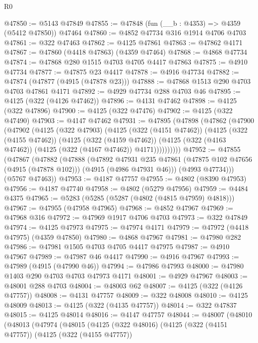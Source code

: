 \begin{lexlean}{R0}
\begin{coremodule}
@47850 := @5143 @47849
@47855 := @47848 (fun (__b : @4353) => @4359 (@5412 @47850)) @47464
@47860 := @4852 @47734 @316 @1914 @4706 @4703
@47861 := @322 @47463
@47862 := @4125 @47861
@47863 := @47862 @4171
@47867 := @47860 (@4418 @47863) (@4359 @47464)
@47868 := @4868 @47734
@47874 := @47868 @280 @1515 @4703 @4705 @4417 @47863
@47875 := @4910 @47734
@47877 := @47875 @23 @4417
@47878 := @4916 @47734
@47882 := @47874 (@47877 (@4915 (@47878 @23)))
@47888 := @47868 @1513 @290 @4703 @4703 @47861 @4171
@47892 := @4929 @47734 @288 @4703 @46
@47895 := @4125 (@322 (@4126 @47462))
@47896 := @4131 @47462
@47898 := @4125 (@322 @47896)
@47900 := @4125 (@322 @47476)
@47902 := @4125 (@322 @47490)
@47903 := @4147 @47462
@47931 := @47895
    (@47898
      (@47862
        (@47900
          (@47902
            (@4125
              (@322 @47903)
              (@4125
                (@322 (@4151 @47462))
                (@4125
                  (@322 (@4155 @47462))
                  (@4125
                    (@322 (@4159 @47462))
                    (@4125 (@322 (@4163 @47462)) (@4125 (@322 (@4167 @47462)) @4171))))))))))
@47952 := @47855
    (@47867
      (@47882
        (@47888
          (@47892
            @47931
            @235
            @47861
            (@47875 @102 @47656 (@4915 (@47878 @102)))
            (@4915 (@4986 @47931 @46)))
          (@4993 @47734)))
      (@5767 @47463))
@47953 := @4187 @47757
@47955 := @4802 (@8390 @47953)
@47956 := @4187 @47740
@47958 := @4802 (@5279 @47956)
@47959 := @4484 @4375
@47965 := @5283 (@5285 (@5287 (@4802 (@4815 @47959) @4818)))
@47967 := @47955 (@47958 @47965)
@47968 := @4852 @47967
@47969 := @47968 @316
@47972 := @47969 @1917 @4706 @4703
@47973 := @322 @47849
@47974 := @4125 @47973
@47975 := @47974 @4171
@47979 := @47972 (@4418 @47975) (@4359 @47850)
@47980 := @4868 @47967
@47981 := @47980 @282
@47986 := @47981 @1505 @4703 @4705 @4417 @47975
@47987 := @4910 @47967
@47989 := @47987 @46 @4417
@47990 := @4916 @47967
@47993 := @47989 (@4915 (@47990 @46))
@47994 := @47986 @47993
@48000 := @47980 @1403 @290 @4703 @4703 @47973 @4171
@48001 := @4929 @47967
@48003 := @48001 @288 @4703
@48004 := @48003 @62
@48007 := @4125 (@322 (@4126 @47757))
@48008 := @4131 @47757
@48009 := @322 @48008
@48010 := @4125 @48009
@48013 := @4125 (@322 (@4135 @47757))
@48014 := @322 @47837
@48015 := @4125 @48014
@48016 := @4147 @47757
@48044 := @48007
    (@48010
      (@48013
        (@47974
          (@48015
            (@4125
              (@322 @48016)
              (@4125
                (@322 (@4151 @47757))
                (@4125
                  (@322 (@4155 @47757))

\end{coremodule}
\end{lexlean}
